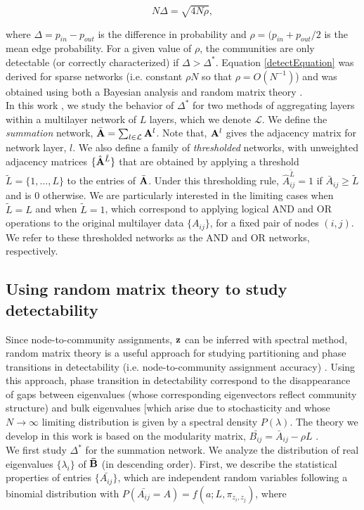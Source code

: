 \begin{equation}
\label{detectEquation}
N\Delta=\sqrt{4N\rho},
\end{equation} 

where $\Delta=p_{in}-p_{out}$ is the difference in probability and $\rho=(p_{in}+p_{out}/2$ is the mean edge probability. For a given value of $\rho$, the communities are only detectable (or correctly characterized) if $\Delta > \Delta^{*}$. Equation \ref{detectEquation} was derived for sparse networks (i.e. constant $\rho N$ so that $\rho=O(N^{-1})$) and was obtained using both a Bayesian analysis \cite{detect23} and random matrix theory \cite{detect24}.\\
\indent In this work , we study the behavior of $\Delta^{*}$ for two methods of aggregating layers within a multilayer network of $L$ layers, which we denote $\mathcal{L}$. We define the \emph{summation} network, $\bar{\bf A}=\sum_{l \in \mathcal{L}} {\bf A}^{l}$. Note that, ${\bf A}^{l}$ gives the adjacency matrix for network layer, $l$. We also define a family of \emph{thresholded} networks, with unweighted adjacency matrices $\{\hat{{\bf A}}^{\tilde{L}}\}$ that are obtained by applying a threshold $\tilde{L}=\{1, \dots, L\}$ to the entries of $\bar{\bf A}$. Under this thresholding rule, $\hat{A}_{ij}^{\tilde{L}}=1$ if $\bar{A}_{ij} \ge \tilde{L}$ and is 0 otherwise. We are particularly interested in the limiting cases when $\tilde{L}=L$ and when $\tilde{L}=1$, which correspond to applying logical AND and OR operations to the original multilayer data $\{A_{ij}\}$, for a fixed pair of nodes $(i,j)$. We refer to these thresholded networks as the AND and OR networks, respectively. 

\subsection{Using random matrix theory to study detectability}
\indent Since node-to-community assignments, ${\bf z}$ can be inferred with spectral method, random matrix theory \cite{detect38,detect39} is a useful approach for studying partitioning and phase transitions in detectability (i.e. node-to-community assignment accuracy) \cite{detect24,peixotoHierarchAttribute,HierarchAttl}. Using this approach, phase transition in detectability correspond to the disappearance of  gaps between eigenvalues (whose corresponding eigenvectors reflect community structure) and bulk eigenvalues [which arise due to stochasticity and whose $N \rightarrow \infty$ limiting distribution is given by a spectral density $P(\lambda)$. The theory we develop in this work is based on the modularity matrix, $\bar{B_{ij}}=\bar{A}_{ij}-\rho L$ \cite{newmangirvan}. \\
\indent We first study $\Delta^{*}$ for the summation network. We analyze the distribution of real eigenvalues $\{\lambda_{i}\}$ of ${\bf \bar{B}}$ (in descending order). First, we describe the statistical properties of entries $\{\bar{A_{ij}}\}$, which are independent random variables following a binomial distribution with $P(\bar{A_{ij}}=A)=f(a;L,\pi_{z_{i},z_{j}})$, where

